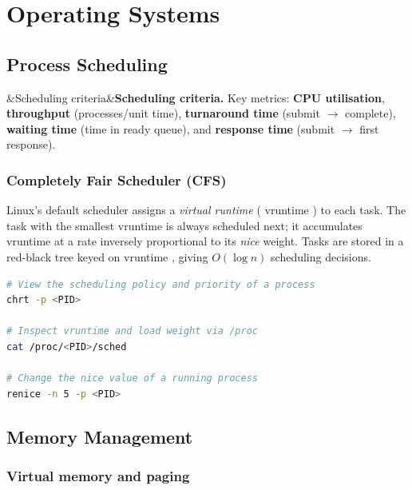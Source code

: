 \documentclass[12pt,a4paper]{article}
\newcommand{\ic}[1]{%
  \mbox{\colorbox{AnthCodeBG}{\footnotesize\ttfamily\textcolor{AnthBlue}{#1}}}%
}
\newenvironment{Def}[1][]{%
  \begin{tcolorbox}[defbox]\ifx&#1&\else\textbf{#1.}\enspace\fi}{\end{tcolorbox}}
\begin{document}
\section{Operating Systems}

\subsection{Process Scheduling}

\begin{Def}[Scheduling criteria]
  Key metrics: \textbf{CPU utilisation}, \textbf{throughput} (processes/unit time),
  \textbf{turnaround time} (submit $\to$ complete), \textbf{waiting time} (time in ready
  queue), and \textbf{response time} (submit $\to$ first response).
\end{Def}

\subsubsection{Completely Fair Scheduler (CFS)}

Linux's default scheduler assigns a \emph{virtual runtime} (\ic{vruntime}) to each
task. The task with the smallest \ic{vruntime} is always scheduled next; it accumulates
\ic{vruntime} at a rate inversely proportional to its \emph{nice} weight. Tasks are
stored in a red-black tree keyed on \ic{vruntime}, giving $O(\log n)$ scheduling
decisions.

\begin{tcolorbox}[codebox, title=Inspecting CFS scheduling weights (Linux)]
\begin{lstlisting}[language=bash]
# View the scheduling policy and priority of a process
chrt -p <PID>

# Inspect vruntime and load weight via /proc
cat /proc/<PID>/sched

# Change the nice value of a running process
renice -n 5 -p <PID>
\end{lstlisting}
\end{tcolorbox}

\subsection{Memory Management}

\subsubsection{Virtual memory and paging}
\end{document}
